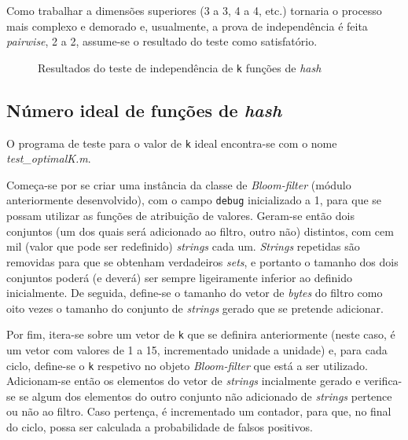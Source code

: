 \documentclass[a4paper,11pt,openright,oneside]{report}
\begin{document}
Como trabalhar a dimensões superiores (3 a 3, 4 a 4, etc.) tornaria o processo mais complexo e demorado e, usualmente, a prova de independência é feita \textit{pairwise}, 2 a 2, assume-se o resultado do teste como satisfatório.

\begin{figure}[ht]
\center
{}
\caption{Resultados do teste de independência de \texttt{k} funções de \textit{hash}}
\label{fig:hashindep}
\end{figure}

\subsection{Número ideal de funções de \textit{hash}}
\label{subsec.optimalk}

O programa de teste para o valor de \texttt{k} ideal encontra-se com o nome \textit{test\_optimalK.m}.

Começa-se por se criar uma instância da classe de \textit{Bloom-filter} (módulo anteriormente desenvolvido), com o campo \texttt{debug} inicializado a 1, para que se possam utilizar as funções de atribuição de valores. Geram-se então dois conjuntos (um dos quais será adicionado ao filtro, outro não) distintos, com cem mil (valor que pode ser redefinido) \textit{strings} cada um. \textit{Strings} repetidas são removidas para que se obtenham verdadeiros \textit{sets}, e portanto o tamanho dos dois conjuntos poderá (e deverá) ser sempre ligeiramente inferior ao definido inicialmente. De seguida, define-se o tamanho do vetor de \textit{bytes} do filtro como oito vezes o tamanho do conjunto de \textit{strings} gerado que se pretende adicionar.

Por fim, itera-se sobre um vetor de \texttt{k} que se definira anteriormente (neste caso, é um vetor com valores de 1 a 15, incrementado unidade a unidade) e, para cada ciclo, define-se o \texttt{k} respetivo no objeto \textit{Bloom-filter} que está a ser utilizado. Adicionam-se então os elementos do vetor de \textit{strings} incialmente gerado e verifica-se se algum dos elementos do outro conjunto não adicionado de \textit{strings} pertence ou não ao filtro. Caso pertença, é incrementado um contador, para que, no final do ciclo, possa ser calculada a probabilidade de falsos positivos.
\end{document}
